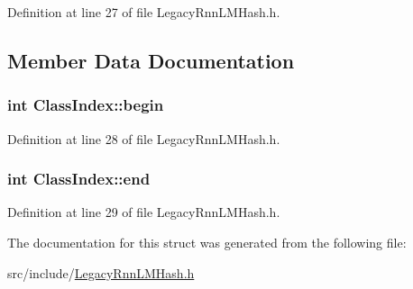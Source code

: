 Definition at line 27 of file Legacy\+Rnn\+L\+M\+Hash.\+h.



\subsection{Member Data Documentation}
\subsubsection[{begin}]{\setlength{\rightskip}{0pt plus 5cm}int Class\+Index\+::begin}\hypertarget{struct_class_index_aa80c58d9fd92f2cfe3c5ea6a3c5fd50d}{}\label{struct_class_index_aa80c58d9fd92f2cfe3c5ea6a3c5fd50d}


Definition at line 28 of file Legacy\+Rnn\+L\+M\+Hash.\+h.

\subsubsection[{end}]{\setlength{\rightskip}{0pt plus 5cm}int Class\+Index\+::end}\hypertarget{struct_class_index_aed19927ac586ba1c38b5fa03af21ad2b}{}\label{struct_class_index_aed19927ac586ba1c38b5fa03af21ad2b}


Definition at line 29 of file Legacy\+Rnn\+L\+M\+Hash.\+h.



The documentation for this struct was generated from the following file\+:\begin{DoxyCompactItemize}
\item 
src/include/\hyperlink{_legacy_rnn_l_m_hash_8h}{Legacy\+Rnn\+L\+M\+Hash.\+h}\end{DoxyCompactItemize}
